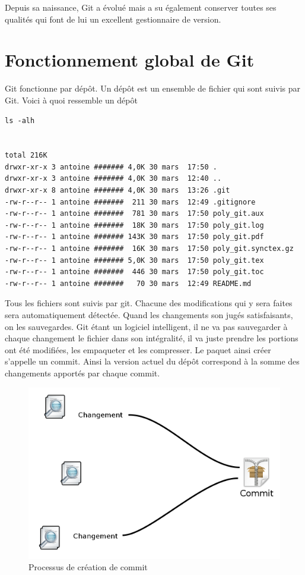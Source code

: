 \documentclass[a4paper]{article}
\begin{document}
Depuis sa naissance, Git a évolué mais a su également conserver toutes ses qualités qui font de lui un excellent gestionnaire de version.

\section{Fonctionnement global de Git}

Git fonctionne par dépôt. Un dépôt est un ensemble de fichier qui sont suivis par Git. Voici à quoi ressemble un dépôt

\begin{verbatim}
ls -alh


total 216K
drwxr-xr-x 3 antoine ####### 4,0K 30 mars  17:50 .
drwxr-xr-x 3 antoine ####### 4,0K 30 mars  12:40 ..
drwxr-xr-x 8 antoine ####### 4,0K 30 mars  13:26 .git
-rw-r--r-- 1 antoine #######  211 30 mars  12:49 .gitignore
-rw-r--r-- 1 antoine #######  781 30 mars  17:50 poly_git.aux
-rw-r--r-- 1 antoine #######  18K 30 mars  17:50 poly_git.log
-rw-r--r-- 1 antoine ####### 143K 30 mars  17:50 poly_git.pdf
-rw-r--r-- 1 antoine #######  16K 30 mars  17:50 poly_git.synctex.gz
-rw-r--r-- 1 antoine ####### 5,0K 30 mars  17:50 poly_git.tex
-rw-r--r-- 1 antoine #######  446 30 mars  17:50 poly_git.toc
-rw-r--r-- 1 antoine #######   70 30 mars  12:49 README.md

\end{verbatim}

Tous les fichiers sont suivis par git. Chacune des modifications qui y sera faites sera automatiquement détectée. Quand les changements son jugés satisfaisants, on les sauvegardes. Git étant un logiciel intelligent, il ne va pas sauvegarder à chaque changement le fichier dans son intégralité, il va juste prendre les portions ont été modifiées, les empaqueter et les compresser. Le paquet ainsi créer s'appelle un commit. Ainsi la version actuel du dépôt correspond à la \og somme \fg des changements apportés par chaque commit.

\begin{figure}[h]
\centering
\label{figure_commit}
\includegraphics[scale=0.25]{commit.png}
\caption{Processus de création de commit}
\end{figure}
\end{document}
